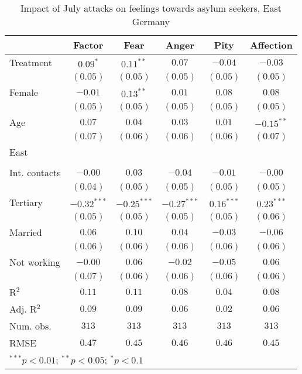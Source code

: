
\begin{table}
\caption{Impact of July attacks on feelings towards asylum seekers, East Germany}
\begin{center}
\begin{tabular}{l c c c c c}
\toprule
 & Factor & Fear & Anger & Pity & Affection \\
\midrule
Treatment     & $0.09^{*}$    & $0.11^{**}$   & $0.07$        & $-0.04$      & $-0.03$      \\
              & $(0.05)$      & $(0.05)$      & $(0.05)$      & $(0.05)$     & $(0.05)$     \\
Female        & $-0.01$       & $0.13^{**}$   & $0.01$        & $0.08$       & $0.08$       \\
              & $(0.05)$      & $(0.05)$      & $(0.05)$      & $(0.05)$     & $(0.05)$     \\
Age           & $0.07$        & $0.04$        & $0.03$        & $0.01$       & $-0.15^{**}$ \\
              & $(0.07)$      & $(0.06)$      & $(0.06)$      & $(0.06)$     & $(0.07)$     \\
East          &               &               &               &              &              \\
              &               &               &               &              &              \\
Int. contacts & $-0.00$       & $0.03$        & $-0.04$       & $-0.01$      & $-0.00$      \\
              & $(0.04)$      & $(0.05)$      & $(0.05)$      & $(0.05)$     & $(0.05)$     \\
Tertiary      & $-0.32^{***}$ & $-0.25^{***}$ & $-0.27^{***}$ & $0.16^{***}$ & $0.23^{***}$ \\
              & $(0.05)$      & $(0.05)$      & $(0.05)$      & $(0.05)$     & $(0.06)$     \\
Married       & $0.06$        & $0.10$        & $0.04$        & $-0.03$      & $-0.06$      \\
              & $(0.06)$      & $(0.06)$      & $(0.06)$      & $(0.06)$     & $(0.06)$     \\
Not working   & $-0.00$       & $0.06$        & $-0.02$       & $-0.05$      & $0.06$       \\
              & $(0.07)$      & $(0.06)$      & $(0.06)$      & $(0.06)$     & $(0.06)$     \\
\midrule
R$^2$         & $0.11$        & $0.11$        & $0.08$        & $0.04$       & $0.08$       \\
Adj. R$^2$    & $0.09$        & $0.09$        & $0.06$        & $0.02$       & $0.06$       \\
Num. obs.     & $313$         & $313$         & $313$         & $313$        & $313$        \\
RMSE          & $0.47$        & $0.45$        & $0.46$        & $0.46$       & $0.45$       \\
\bottomrule
\multicolumn{6}{l}{\scriptsize{$^{***}p<0.01$; $^{**}p<0.05$; $^{*}p<0.1$}}
\end{tabular}
\label{tab_emo_east}
\end{center}
\end{table}
